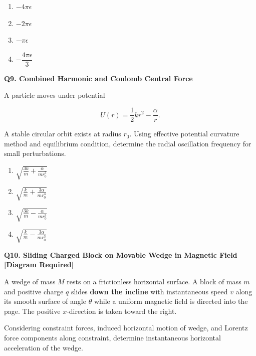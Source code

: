 \documentclass[12pt]{article}
\begin{document}
\begin{enumerate}
\item[(A)] $-4\pi\epsilon$
\item[(B)] $-2\pi\epsilon$
\item[(C)] $-\pi\epsilon$
\item[(D)] $-\dfrac{4\pi\epsilon}{3}$
\end{enumerate}


\textbf{Q9. Combined Harmonic and Coulomb Central Force}

A particle moves under potential  

\[
U(r)=\frac12 kr^2 - \frac{\alpha}{r}.
\]

A stable circular orbit exists at radius $r_0$. Using effective potential curvature method and equilibrium condition, determine the radial oscillation frequency for small perturbations.

\begin{enumerate}
\item[(A)] $\sqrt{\frac{3k}{m}+\frac{\alpha}{mr_0^3}}$
\item[(B)] $\sqrt{\frac{k}{m}+\frac{3\alpha}{mr_0^3}}$
\item[(C)] $\sqrt{\frac{3k}{m}-\frac{\alpha}{mr_0^3}}$
\item[(D)] $\sqrt{\frac{k}{m}-\frac{3\alpha}{mr_0^3}}$
\end{enumerate}


\textbf{Q10. Sliding Charged Block on Movable Wedge in Magnetic Field [Diagram Required]}

A wedge of mass $M$ rests on a frictionless horizontal surface. A block of mass $m$ and positive charge $q$ slides \textbf{down the incline} with instantaneous speed $v$ along its smooth surface of angle $\theta$ while a uniform magnetic field is directed into the page. The positive $x$-direction is taken toward the right.  

Considering constraint forces, induced horizontal motion of wedge, and Lorentz force components along constraint, determine instantaneous horizontal acceleration of the wedge.
\end{document}
